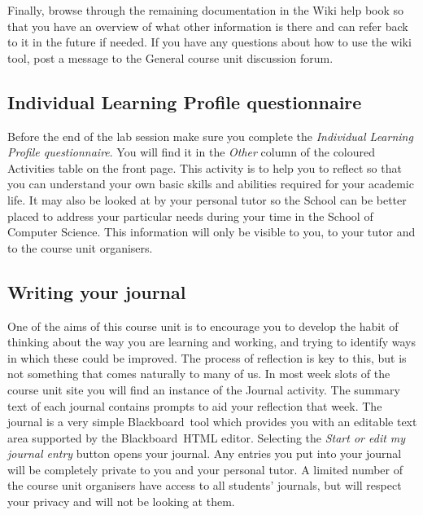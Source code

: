 \begin{firstonly}



 Finally, browse through the remaining documentation in the Wiki help book so that you have an overview of what other information is there and can refer back to it in the future if needed. If you have any questions about how to use the wiki tool, post a message to the General course unit discussion forum.

 \subsection{Individual Learning Profile questionnaire}
 \label{sec:indiv-learn-prof}

 Before the end of the lab session make sure you complete the \emph{Individual Learning Profile questionnaire}. You will find it in the \emph{Other} column of the coloured Activities table on the  front page. This activity is to help you to reflect so that you can understand your own basic skills and abilities required for your academic life. It may also be looked at by your personal tutor so the School can be better placed to address your particular needs during your time in the School of Computer Science. This information will only be visible to you, to your tutor and to the course unit organisers.

\subsection{Writing your journal}
\label{sec:writing-your-journal}


One of the aims of this course unit is to encourage you to develop the habit of thinking about the way you are learning and working, and trying to identify ways in which these could be improved. The process of reflection is key to this, but is not something that comes naturally to many of us. In most week slots of the course unit site you will find an instance of the Journal activity. The summary text of each journal contains prompts to aid your reflection that week. The journal is a very simple Blackboard\ tool which provides you with an editable text area supported by the Blackboard\ HTML editor. Selecting the \emph{Start or edit my journal entry} button opens your journal. Any entries you put into your journal will be completely private to you and your personal  tutor. A limited number of the course unit organisers have access to all students' journals, but will respect your privacy and will not be looking at them.


\end{firstonly}
